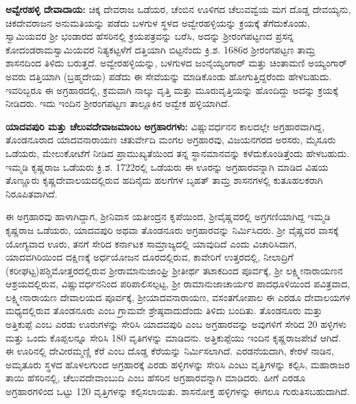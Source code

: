 \textbf{ಅವ್ವೇರಹಳ್ಳಿ ದೇವಾದಾಯ:} ಚಿಕ್ಕ ದೇವರಾಜ ಒಡೆಯರ, ಚೆಂಬಿನ ಊಳಿಗದ ಚೆಲುವವ್ವೆಯ ಮಗ ದೊಡ್ಡ ದೇವಯ್ಯನು, ಚಿಕದೇವರಾಜನ ಅನುಮತಿಯನ್ನು ಪಡೆದು ಬಳಗುಳ ಸ್ಥಳದ ಅವ್ವೇರಹಳ್ಳಿಯನ್ನು ಕ್ರಯಕ್ಕೆ ತೆಗೆದುಕೊಂಡು, ಸ್ವಾಮಿಯವರ ಶ‍್ರೀ ಭಂಡಾರದ ಹೆಸರಿನಲ್ಲಿ ಕ್ರಯಪತ್ರವನ್ನು ಬರೆಸಿ, ಅದನ್ನು ಶ‍್ರೀರಂಗಪಟ್ಟಣದ ಪ್ರಸನ್ನ ಕೋದಂಡರಾಮಸ್ವಾಮಿ\-ಯವರ ನಿತ್ಯಕಟ್ಟಳೆಗೆ ದತ್ತಿಯಾಗಿ ಬಿಟ್ಟನೆಂದು ಕ್ರಿ.ಶ. 1686ರ ಶ‍್ರೀರಂಗಪಟ್ಟಣ ತಾಮ್ರ ಶಾಸನದಿಂದ ತಿಳಿದು ಬರುತ್ತದೆ. ಅವ್ವೇರಹಳ್ಳಿಯನ್ನು, ಬಳಗುಳದ ಜಂನೈಯ್ಯಂಗಾರ್​ ಮತ್ತು ಚಿಂತಾಮಣಿ ಅಯ್ಯಂಗಾರ್​ ಅವರು ದತ್ತಿಯಾಗಿ (ಬ್ರಹ್ಮದೇಯ) ಪಡೆದು ಈ ಸೇವೆಯನ್ನು ಮಾಡಿಕೊಂಡು ಹೋಗುತ್ತಿದ್ದರೆಂದು ಹೇಳಬಹುದು. ಇವರಿಬ್ಬರೂ ಈ ಅಗ್ರಹಾರದಲ್ಲಿ, ಕ್ರಮವಾಗಿ ನಾಲ್ಕು ವೃತ್ತಿ ಮತ್ತು ಮೂರುವೃತ್ತಿಯನ್ನು ಹೊಂದಿದ್ದು ಅದನ್ನು ಕ್ರಯಕ್ಕೆ ನೀಡಿದರು. ಇದು ಇಂದಿನ ಶ‍್ರೀರಂಗಪಟ್ಟಣ ತಾಲ್ಲೂಕಿನ ಅವ್ವೇಕ ಹಳ್ಳಿಯಾಗಿದೆ.

\textbf{ಯಾದವಪುರಿ ಮತ್ತು ಚೆಲುವದೇವಾಜಮಾಂಬ ಅಗ್ರಹಾರಗಳು:} ವಿಷ್ಣುವರ್ಧನನ ಕಾಲದಲ್ಲೇ ಅಗ್ರಹಾರವಾಗಿದ್ದ, ತೊಂಡನೂರಾದ ಯಾದವನಾರಾಯಣ ಚತುರ್ವೇದಿ ಮಂಗಲ ಅಗ್ರಹಾರವು, ವಿಜಯನಗರದ ಅರಸರು, ಮೈಸೂರು ಒಡೆಯರು, ಮೇಲುಕೋಟೆಗೆ ನೀಡಿದ ಪ್ರಾಮುಖ್ಯತೆಯಿಂದ ತನ್ನ ಸ್ಥಾನಮಾನವನ್ನು ಕಳೆದುಕೊಂಡಿತ್ತೆಂದು ಹೇಳಬಹುದು. ಇಮ್ಮಡಿ ಕೃಷ್ಣರಾಜ ಒಡೆಯರು ಕ್ರಿ.ಶ. 1722ರಲ್ಲಿ ಒಡೆಯರು ಈ ಊರನ್ನು ಅಗ್ರಹಾರವನ್ನಾಗಿ ಮಾಡಿದ ವಿಷಯ ತೊಣ್ಣೂರು ಕೃಷ್ಣದೇವಾಲಯದಲ್ಲಿರುವ ಹದಿನೈದು ಹಲಗೆಗಳ ಬೃಹತ್ ತಾಮ್ರ ಶಾಸನಗಳಲ್ಲಿ ಕುತೂಹಲಕರಾಗಿ ನಿರೂಪಿತವಾಗಿದೆ.

ಈ ಅಗ್ರಹಾರವು ಹಾಳಾಗಿದ್ದಾಗ, ಶ‍್ರೀನಿವಾಸ ಯತೀಂದ್ರನ ಕೃಪೆಯಿಂದ, ಶ‍್ರೀವೈಷ್ಣವರಲ್ಲಿ ಅಗ್ರಗಣಿಯಾಗಿದ್ದ ಇಮ್ಮಡಿ ಕೃಷ್ಣರಾಜ ಒಡೆಯರು, ಯಾದವಪುರಿ ಅಥವಾ ತೊಂಡನೂರು ಅಗ್ರಹಾರವನ್ನು ನಿರ್ಮಿಸಿದರು. ಶ‍್ರೀ ವೈಷ್ಣವರ ವಾಸಕ್ಕೆ ಯೋಗ್ಯವಾದ ಊರು, ತನಗೆ ಸೇರಿದ ಕರ್ನಾಟಕ ಸಾಮ್ರಾಜ್ಯದಲ್ಲಿ ಯಾವುದಿದೆ ಎಂದು ವಿಚಾರಿಸಿದಾಗ, ಯಾದವಗಿರಿಯಿಂದ ದಕ್ಷಿಣಕ್ಕೆ ಅರ್ಧಯೋಜನ ದೂರದಲ್ಲಿರುವ, ಕಾವೇರಿಗೆ ಉತ್ತರದಲ್ಲಿ, ನೀಲಾದ್ರಿಗೆ (ಕರೀಘಟ್ಟ)\break ಪಶ್ಚಿಮೋತ್ತರದಲ್ಲಿರುವ ಶ‍್ರೀರಾಮಾನುಜಾಂಘ್ರಿ ಶ‍್ರೀತೀರ್ಥ ತಟಾಕದಿಂದ ಪೂರ್ವಕ್ಕೆ, ಶ‍್ರೀ ಲಕ್ಷ್ಮೀನಾರಾಯಣನ ಆಶ್ರಯದಲ್ಲಿರುವ, ವಿಷ್ಣುವರ್ಧನನಿಂದ ಪರಿಪಾಲಿಸಲ್ಪಟ್ಟ, ಶ‍್ರೀ ರಾಮಾನುಜಾಚಾರ್ಯರ ಪಾದಧೂಳಿಯಿಂದ ಪವಿತ್ರವಾದ, ಲಕ್ಷ್ಮೀನಾರಾಯಣ ದೇವಾಲಯದ ಪೂರ್ವಕ್ಕೆ, ಶ‍್ರೀಯಾದವನಾರಾಯಣ, ವಸಂತಗೋಪಾಲ ಈ ಎರಡೂ ದೇವಾಲಯಗಳ ಮಧ್ಯದಲ್ಲಿರುವ ತೊಂಡನೂರು ಎಂಬ ಗ್ರಾಮವೇ ಶ್ರೇಷ್ಠವಾದುದೆಂದು ತಿಳಿದು ಬಂದಿತು. ತೊಂಡನೂರು ಮತ್ತು ಅತ್ತಿಕುಪ್ಪೆ ಎಂಬ ಎರಡು ಊರುಗಳನ್ನು ಸೇರಿಸಿ ಯಾದವಪುರಿ ಎಂಬ ಅಗ್ರಹಾರವನ್ನು ಅವುಗಳಿಗೆ ಸೇರಿದ 20 ಹಳ್ಳಿಗಳು ಮತ್ತು ಒಂದು ಕೊಪ್ಪಲನ್ನೂ ಸೇರಿಸಿ 180 ವೃತಿಗಳನ್ನು ಮಾಡಿದನು. ಅತ್ತಿಕುಪ್ಪೆಯು ಇಂದಿನ ಕೃಷ್ಣರಾಜಪೇಟೆ ಆಗಿದೆ. ಈ ಊರಿನಲ್ಲಿ ದೇವೀರಮ್ಮಣ್ಣಿ ಕೆರೆ ಎಂಬ ದೊಡ್ಡ ಕೆರೆಯನ್ನು ನಿರ್ಮಿಸಲಾಗಿದೆ. ಎರಡನೆಯದಾಗಿ, ಕೇರಳೆ ನಾಡಿನ, ಅಮೃತೂರು ಸ್ಥಳದ ಹೊಳಲಗುಂದ ಅಗ್ರಹಾರಕ್ಕೆ ಎರಡು ಹಳ್ಳಿಗಳನ್ನು ಸೇರಿಸಿ ಎಂಟು ವೃತ್ತಿಗಳನ್ನು ಕಲ್ಪಿಸಿ, ಮಹಾರಾಜರ ತಾಯಿ ಹೆಸರಿನಲ್ಲಿ, ಚೆಲುವದೇವಾಂಬುದಿ ಎಂಬ ಹೆಸರಿನ ಅಗ್ರಹಾರವನ್ನಾಗಿ ಮಾಡಿದರು. ಹೀಗೆ ಎರಡೂ ಅಗ್ರಹಾರಗಳಿಂದ ಒಟ್ಟು 120 ವೃತ್ತಿಗಳನ್ನು ಕಲ್ಪಿಸಲಾಯಿತು. ಶಾಸನೋಕ್ತ ಹಳ್ಳಿಗಳನ್ನು ಈಗಲೂ ಗುರುತಿಸಬಹುದಾಗಿದೆ.

